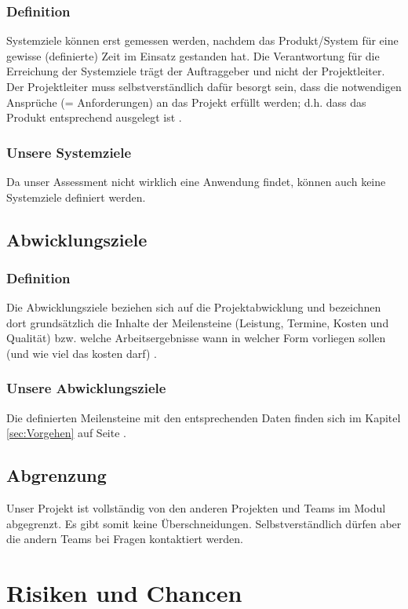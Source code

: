 \subsubsection{Definition}
Systemziele können erst gemessen werden, nachdem das Produkt/System für eine gewisse (definierte) Zeit im Einsatz gestanden hat. Die Verantwortung für die Erreichung der Systemziele trägt der Auftraggeber und nicht der Projektleiter.\\
Der Projektleiter muss selbstverständlich dafür besorgt sein, dass die notwendigen Ansprüche (= Anforderungen) an das Projekt erfüllt werden; d.h. dass das Produkt entsprechend ausgelegt ist \cite{page:Systemziel}.

\subsubsection{Unsere Systemziele}
Da unser Assessment nicht wirklich eine Anwendung findet, können auch keine Systemziele definiert werden. 
\subsection{Abwicklungsziele}
\subsubsection{Definition}
Die Abwicklungsziele beziehen sich auf die Projektabwicklung und bezeichnen dort grundsätzlich die Inhalte der Meilensteine (Leistung, Termine, Kosten und Qualität) bzw. welche Arbeitsergebnisse wann in welcher Form vorliegen sollen (und wie viel das kosten darf) \cite{page:Abwicklungsziel}.
\subsubsection{Unsere Abwicklungsziele}
Die definierten Meilensteine mit den entsprechenden Daten finden sich im Kapitel \ref{sec:Vorgehen} auf Seite \pageref{sec:Vorgehen}. 
\subsection{Abgrenzung}
Unser Projekt ist vollständig von den anderen Projekten und Teams im Modul abgegrenzt. Es gibt somit keine Überschneidungen. Selbstverständlich dürfen aber die andern Teams bei Fragen kontaktiert werden.
\section{Risiken und Chancen}

